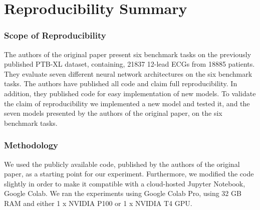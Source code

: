 \section*{\centering Reproducibility Summary}



\subsubsection*{Scope of Reproducibility}
The authors of the original paper present six benchmark tasks on the previously published PTB-XL dataset, containing, 21837 12-lead ECGs from 18885 patients. They evaluate seven different neural network architectures on the six benchmark tasks. The authors have published all code and claim full reproducibility. In addition, they published code for easy implementation of new models. To validate the claim of reproducibility we implemented a new model and tested it, and the seven models presented by the authors of the original paper, on the six benchmark tasks.


\subsubsection*{Methodology}

We used the publicly available code, published by the authors of the original paper, as a starting point for our experiment. Furthermore, we modified the code slightly in order to make it compatible with a cloud-hosted Jupyter Notebook, Google Colab. We ran the experiments using Google Colab Pro, using 32 GB RAM and either 1 x NVIDIA P100 or 1 x NVIDIA T4 GPU.  


